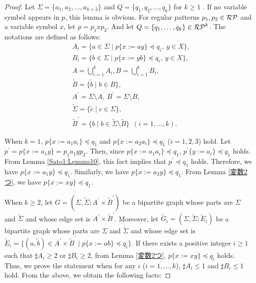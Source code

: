 \begin{proof}
Let $\Sigma=\{a_{1}, a_{2}, \ldots, a_{k+2}\}$ and $Q=\{q_{1}, q_{2}, \ldots, q_{k}\}$ for $k\geq 1$ .
If no variable symbol appears in $p$, this lemma is obvious.
For regular patterns $p_{1},p_{2}\in \mathcal{RP}$ and a variable symbol $x$, let $p=p_{1}xp_{2}$.
And let $Q=\{ q_{1}, \ldots , q_{k} \}\in \mathcal{RP}^{k}$.
The notations are defined as follows:
\begin{align*}
& A_{i} = \{ a \in \Sigma \mid p \{ x:=ay \} \preceq q_{i},\ y\in X\},\\ 
& B_{i} = \{ b \in \Sigma \mid p \{ x:=yb \} \preceq q_{i},\ y\in X\},\\ 
& A = \bigcup_{i=1}^{k}A_{i},B = \bigcup_{i=1}^{k} B_{i},\\
& \tilde{B} = \{ \tilde{b} \mid b \in B \},\\
& A^{\prime} = \Sigma\setminus A,~B^{\prime} = \Sigma\setminus B,\\
& \tilde{\Sigma} = \{ \tilde{c} \mid c \in \Sigma \},\\
& \tilde{B}^{\prime} = \{ b \mid b \in \tilde{\Sigma} \setminus \tilde{B} \}~~(i=1, \ldots , k).
\end{align*}


When $k=1$, $p \{ x:=a_{1}a_{i} \} \preceq q_{1}$ and $p \{ x:=a_{2}a_{i} \} \preceq q_{1}$ ($i=1,2,3$) hold.
Let $p^{\prime} = p \{ x:=a_{1}y \} = p_{1}a_{1}yp_{2}$.
Then, since $p \{ x:=a_{1}a_{i} \} \preceq q_{1}$, $p^{\prime} \{ y:=a_{i} \} \preceq q_{1}$ holds.
From Lemma \ref{Sato1:Lemma10}, this fact implies that $p^{\prime} \preceq q_{1}$ holds.
Therefore, we have $p \{ x:=a_{1}y \} \preceq q_{1}$.
Similarly, we have  $p \{ x:=a_{2}y \} \preceq q_{1}$.
From Lemma \ref{変数2つ}, we have $p \{ x:= xy \} \preceq q_{1}$.

When $k \ge 2$, let $G=(\Sigma,\tilde{\Sigma}; A^{\prime} \times \tilde{B}^{\prime})$ be a bipartite graph whose parts are $\Sigma$ and $\tilde{\Sigma}$ and whose edge set is $A^{\prime}\times\tilde{B}^{\prime}$.
Moreover, let $\tilde{G}_{i}=(\Sigma,\tilde{\Sigma}; \tilde{E}_{i})$ be a bipartite graph whose parts are $\Sigma$ and $\tilde{\Sigma}$ and whose edge set is $\tilde{E}_{i}=\{ (a, \tilde{b}) \in A^{\prime} \times \tilde{B}^{\prime} \mid p \{ x:=ab \} \preceq q_{i} \}$.
%
If there exists a positive integer $i\geq 1$ such that $\sharp A_{i} \ge 2$ or $\sharp B_{i} \ge 2$, from Lemma \ref{変数2つ}, $p \{ x:=xy \} \preceq q_{i}$ holds.
Thus, we prove the statement when for any $i$ ($i=1, \ldots , k$), $\sharp A_{i} \le 1$ and $\sharp B_{i} \le 1$ hold.
From the above, we obtain the following facts:


\end{proof}
